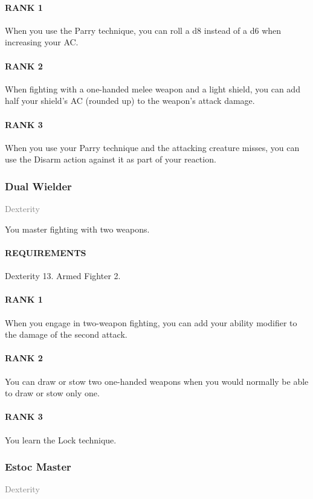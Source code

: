 \paragraph{RANK 1} When you use the Parry technique, you can roll a d8 instead of a d6 when increasing your AC.
\paragraph{RANK 2} When fighting with a one-handed melee weapon and a light shield, you can add half your shield's AC (rounded up) to the weapon's attack damage.
\paragraph{RANK 3} When you use your Parry technique and the attacking creature misses, you can use the Disarm action against it as part of your reaction.

\subsubsection{Dual Wielder} \label{feat::dualwielder}
\small{\textcolor{gray}{Dexterity}}

\normalsize
You master fighting with two weapons.
\paragraph{REQUIREMENTS} Dexterity 13. Armed Fighter 2.
\paragraph{RANK 1} When you engage in two-weapon fighting, you can add your ability modifier to the damage of the second attack.
\paragraph{RANK 2} You can draw or stow two one-handed weapons when you would normally be able to draw or stow only one.
\paragraph{RANK 3} You learn the Lock technique.

\subsubsection{Estoc Master} \label{feat::estocmaster}
\small{\textcolor{gray}{Dexterity}}

